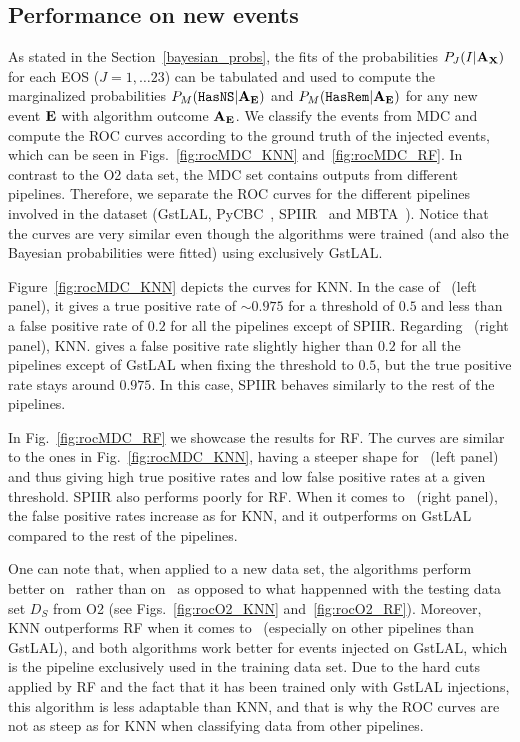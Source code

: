 \subsection{Performance on new events}

As stated in the Section~\ref{bayesian_probs}, the fits of the probabilities $P_J(I|{\bf A}_{\bf X})$ for each EOS ($J=1,\dots 23$) can be tabulated and used to compute the marginalized
probabilities $P_M({{\tt HasNS}}|{\bf A}_{\bf E})$ and $P_M({{\tt HasRem}}|{\bf A}_{\bf E})$ for any new event $\bf E$ with algorithm outcome $\bf A_{E}$.  We classify the events from MDC and compute the ROC
curves according to the ground truth of the injected events, which can be seen in Figs.~\ref{fig:rocMDC_KNN} and~\ref{fig:rocMDC_RF}. In contrast to the \ac{O2} data set, the \ac{MDC} set contains
outputs from different pipelines. Therefore, we separate the ROC curves for the different pipelines involved in the dataset (GstLAL,  PyCBC~\cite{Usman:2015kfa}, SPIIR~\cite{Chu:2020pjv} and
MBTA~\cite{Adams:2015ulm}). Notice that the curves are very similar even though the algorithms were trained (and also the Bayesian probabilities were fitted) using exclusively GstLAL.

Figure~\ref{fig:rocMDC_KNN} depicts the curves for \ac{KNN}.  In the case of
\hasns\ (left panel), it gives a true positive rate of $\sim 0.975$ for a
threshold of $0.5$ and less than a false positive rate of $0.2$ for all the
pipelines except of SPIIR. Regarding \hasrem\ (right panel), \ac{KNN}. gives a
false positive rate slightly higher than $0.2$ for all the pipelines except of
GstLAL when fixing the threshold to $0.5$, but the true positive rate stays
around $0.975$. In this case, SPIIR behaves similarly to the rest of the pipelines. 

In Fig.~\ref{fig:rocMDC_RF} we showcase the results for \ac{RF}.  The curves
are similar to the ones in Fig.~\ref{fig:rocMDC_KNN}, having a steeper shape for \hasns\ (left panel) and thus giving high true positive rates and low false positive rates at a given threshold. SPIIR also performs poorly for \ac{RF}. When it comes to \hasrem\ (right panel), the false positive rates increase as for \ac{KNN}, and it outperforms on GstLAL compared to the rest of the pipelines.  

One can note that, when applied to a new data set, the algorithms perform better on \hasns\ rather than on \hasrem\, as opposed to what happenned with the testing data set $D_S$ from O2 (see Figs.~\ref{fig:rocO2_KNN} and~\ref{fig:rocO2_RF}). Moreover, \ac{KNN} outperforms \ac{RF} when it comes to \hasrem\ (especially on other pipelines than GstLAL), and both algorithms work better for events injected on GstLAL, which is the pipeline exclusively used in the training data set. Due to the hard cuts applied by \ac{RF} and the fact that it has been trained only with GstLAL injections, this algorithm is less adaptable than \ac{KNN}, and that is why the ROC curves are not as steep as for \ac{KNN} when classifying data from other pipelines. 

